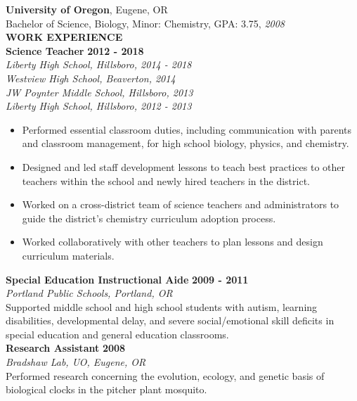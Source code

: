 \documentclass[a4paper,11pt]{article}
\begin{document}
%
\textbf{University of Oregon}, Eugene, OR\\
Bachelor of Science, Biology, Minor: Chemistry, GPA: 3.75, \textit{2008} \bigskip \\
\makebox[0pt][l]{\rule[-.2\baselineskip]{\linewidth}{.3mm}}%
\large{\textbf{WORK EXPERIENCE}}\smallskip \\
%
\textbf{Science Teacher} \hfill \textbf{2012 - 2018}\\
\textit{Liberty High School, Hillsboro, 2014 - 2018}\\
\textit{Westview High School, Beaverton, 2014}\\
\textit{JW Poynter Middle School, Hillsboro, 2013}\\
\textit{Liberty High School, Hillsboro, 2012 - 2013}
%
\begin{itemize}[leftmargin=*, itemsep=0pt, topsep=5pt]
	\item Performed essential classroom duties, including communication with parents and classroom management, for high school biology, physics, and chemistry.
	\item Designed and led staff development lessons to teach best practices to other teachers within the school and newly hired teachers in the district.
	\item Worked on a cross-district team of science teachers and administrators to guide the district’s chemistry curriculum adoption process.
	\item Worked collaboratively with other teachers to plan lessons and design curriculum materials.
\end{itemize}
\medbreak \noindent
%
\textbf{Special Education Instructional Aide} \hfill \textbf{2009 - 2011}\\
\textit{Portland Public Schools, Portland, OR}\\
Supported middle school and high school students with autism, learning disabilities, developmental delay, and severe social/emotional skill deficits in special education and general education classrooms.\medskip\\
%
\textbf{Research Assistant} \hfill \textbf{2008}\\
\textit{Bradshaw Lab, UO, Eugene, OR}\\
Performed research concerning the evolution, ecology, and genetic basis of biological clocks in the pitcher plant mosquito.
\end{document}
